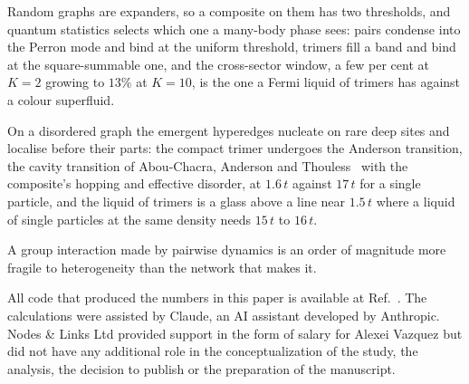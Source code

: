 \documentclass[aps,pre,twocolumn,superscriptaddress,floatfix]{revtex4-2}
\begin{document}
Random graphs are expanders, so a composite on them has
two thresholds, and quantum statistics selects which one a many-body
phase sees: pairs condense into the Perron mode and bind at the uniform
threshold, trimers fill a band and bind at the square-summable one, and
the cross-sector window, a few per cent at $K=2$ growing to $13\%$ at
$K=10$, is the one a Fermi liquid of trimers has against a colour
superfluid.

On a disordered graph the emergent hyperedges nucleate on
rare deep sites and localise before their parts: the compact trimer
undergoes the Anderson transition, the cavity transition of Abou-Chacra,
Anderson and Thouless~\cite{abouchacra1973} with the composite's hopping
and effective disorder, at $1.6\,t$ against $17\,t$ for a single
particle, and the liquid of trimers is a glass above a line near $1.5\,t$
where a liquid of single particles at the same density needs $15\,t$ to
$16\,t$.

A group interaction made by pairwise dynamics is an order of
magnitude more fragile to heterogeneity than the network that makes it.

\begin{acknowledgments}
All code that produced the numbers in this paper is available at
Ref.~\cite{code}. The calculations were assisted by Claude, an AI
assistant developed by Anthropic. Nodes \& Links Ltd provided support in
the form of salary for Alexei Vazquez but did not have any additional role
in the conceptualization of the study, the analysis, the decision to
publish or the preparation of the manuscript.
\end{acknowledgments}



\end{document}
